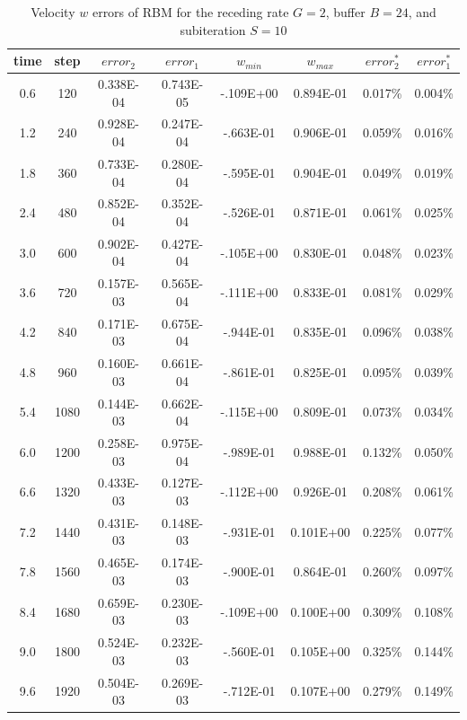 \cp

\begin{table}[hbtp]%
\vspace{0.6in}
\begin{center}
\caption{Velocity $w$ errors of RBM for the receding rate $G=2$, buffer $B=24$, and subiteration $S=10$} %
\small
 \begin{tabular}{cccccccc} \hline %
 time & step & $error_{2}$ &  $error_{1}$ &  $w_{min}$ & $w_{max}$ &  $error_{2}^*$ & $error_{1}^*$ \\ \hline
  0.6 &   120 & 0.338E-04 & 0.743E-05 & -.109E+00 & 0.894E-01 &   0.017\% &   0.004\%  \\
  1.2 &   240 & 0.928E-04 & 0.247E-04 & -.663E-01 & 0.906E-01 &   0.059\% &   0.016\%  \\
  1.8 &   360 & 0.733E-04 & 0.280E-04 & -.595E-01 & 0.904E-01 &   0.049\% &   0.019\%  \\
  2.4 &   480 & 0.852E-04 & 0.352E-04 & -.526E-01 & 0.871E-01 &   0.061\% &   0.025\%  \\
  3.0 &   600 & 0.902E-04 & 0.427E-04 & -.105E+00 & 0.830E-01 &   0.048\% &   0.023\%  \\
  3.6 &   720 & 0.157E-03 & 0.565E-04 & -.111E+00 & 0.833E-01 &   0.081\% &   0.029\%  \\
  4.2 &   840 & 0.171E-03 & 0.675E-04 & -.944E-01 & 0.835E-01 &   0.096\% &   0.038\%  \\
  4.8 &   960 & 0.160E-03 & 0.661E-04 & -.861E-01 & 0.825E-01 &   0.095\% &   0.039\%  \\
  5.4 &  1080 & 0.144E-03 & 0.662E-04 & -.115E+00 & 0.809E-01 &   0.073\% &   0.034\%  \\
  6.0 &  1200 & 0.258E-03 & 0.975E-04 & -.989E-01 & 0.988E-01 &   0.132\% &   0.050\%  \\
  6.6 &  1320 & 0.433E-03 & 0.127E-03 & -.112E+00 & 0.926E-01 &   0.208\% &   0.061\%  \\
  7.2 &  1440 & 0.431E-03 & 0.148E-03 & -.931E-01 & 0.101E+00 &   0.225\% &   0.077\%  \\
  7.8 &  1560 & 0.465E-03 & 0.174E-03 & -.900E-01 & 0.864E-01 &   0.260\% &   0.097\%  \\
  8.4 &  1680 & 0.659E-03 & 0.230E-03 & -.109E+00 & 0.100E+00 &   0.309\% &   0.108\%  \\
  9.0 &  1800 & 0.524E-03 & 0.232E-03 & -.560E-01 & 0.105E+00 &   0.325\% &   0.144\%  \\
  9.6 &  1920 & 0.504E-03 & 0.269E-03 & -.712E-01 & 0.107E+00 &   0.279\% &   0.149\%  \\

\end{tabular}
\end{center}
\end{table}
